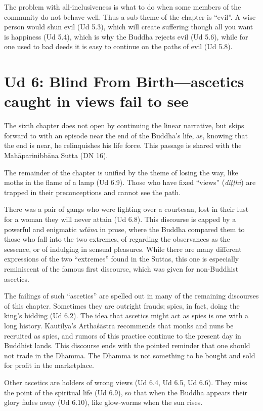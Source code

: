 \documentclass[12pt,openany]{book}%
\begin{document}
 The problem with all-inclusiveness is what to do when some members of the community do not behave well. Thus a sub-theme of the chapter is “evil”. A wise person would shun evil (Ud 5.3), which will create suffering though all you want is happiness (Ud 5.4), which is why the Buddha rejects evil (Ud 5.6), while for one used to bad deeds it is easy to continue on the paths of evil (Ud 5.8).

\section*{Ud 6: Blind From Birth—ascetics caught in views fail to see}

The sixth chapter does not open by continuing the linear narrative, but skips forward to with an episode near the end of the Buddha’s life, as, knowing that the end is near, he relinquishes his life force. This passage is shared with the \textsanskrit{Mahāparinibbāna} Sutta (DN 16). 

The remainder of the chapter is unified by the theme of losing the way, like moths in the flame of a lamp (Ud 6.9). Those who have fixed “views” (\textit{\textsanskrit{diṭṭhi}}) are trapped in their preconceptions and cannot see the path.

There was a pair of gangs who were fighting over a courtesan, lost in their lust for a woman they will never attain (Ud 6.8). This discourse is capped by a powerful and enigmatic \textit{\textsanskrit{udāna}} in prose, where the Buddha compared them to those who fall into the two extremes, of regarding the observances as the sessence, or of indulging in sensual pleasures. While there are many different expressions of the two “extremes” found in the Suttas, this one is especially reminiscent of the famous first discourse, which was given for non-Buddhist ascetics.

The failings of such “ascetics” are spelled out in many of the remaining discourses of this chapter. Sometimes they are outright frauds; spies, in fact, doing the king’s bidding (Ud 6.2). The idea that ascetics might act as spies is one with a long history. Kautilya’s \textsanskrit{Arthaśāstra} recommends that monks and nuns be recruited as spies, and rumors of this practice continue to the present day in Buddhist lands. This discourse ends with the pointed reminder that one should not trade in the Dhamma. The Dhamma is not something to be bought and sold for profit in the marketplace.

Other ascetics are holders of wrong views (Ud 6.4, Ud 6.5, Ud 6.6). They  miss the point of the spiritual life (Ud 6.9), so that when the Buddha appears their glory fades away (Ud 6.10), like glow-worms when the sun rises.
\end{document}
